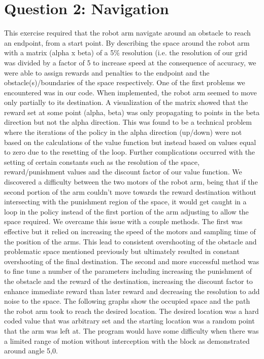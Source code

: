 \section{Question 2: Navigation}

This exercise required that the robot arm navigate around an obstacle to reach an endpoint, from a start point. By describing the space around the robot arm with a matrix (alpha x beta) of a 5\% resolution (i.e. the resolution of our grid was divided by a factor of 5 to increase speed at the consequence of accuracy, we were able to assign rewards and penalties to the endpoint and the obstacle(s)/boundaries of the space respectively. One of the first problems we encountered was in our code. When implemented, the robot arm seemed to move only partially to its destination. A visualization of the matrix showed that the reward set at some point (alpha, beta) was only propagating to points in the beta direction but not the alpha direction. This was found to be a technical problem where the iterations of the policy in the alpha direction (up/down) were not based on the calculations of the value function but instead based on values equal to zero due to the resetting of the loop. Further complications occurred with the setting of certain constants such as the resolution of the space, reward/punishment values and the discount factor of our value function. We discovered a difficulty between the two motors of the robot arm, being that if the second portion of the arm couldn’t move towards the reward destination without intersecting with the punishment region of the space, it would get caught in a loop in the policy instead of the first portion of the arm adjusting to allow the space required. We overcame this issue with a couple methods. The first was effective but it relied on increasing the speed of the motors and sampling time of the position of the arms. This lead to consistent overshooting of the obstacle and problematic space mentioned previously but ultimately resulted in constant overshooting of the final destination. The second and more successful method was to fine tune a number of the parameters including increasing the punishment of the obstacle and the reward of the destination, increasing the discount factor to enhance immediate reward than later reward and decreasing the resolution to add noise to the space.
The following graphs show the occupied space and the path the robot arm took to reach the desired location. The desired location was a hard coded value that was arbitrary set and the starting location was a random point that the arm was left at. The program would have some difficulty when there was a limited range of motion without interception with the block as demonstrated around angle 5,0. 

